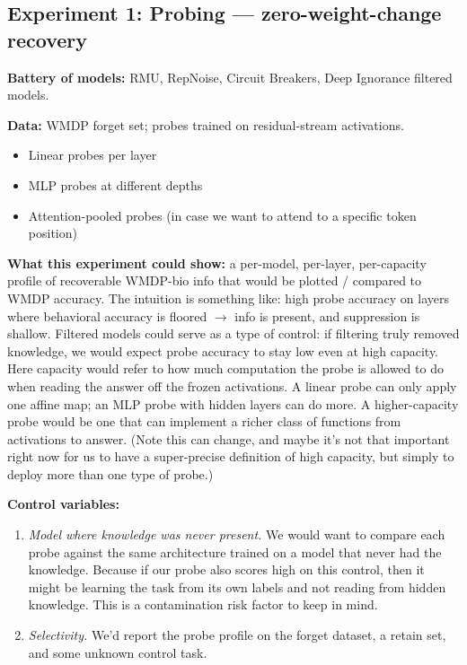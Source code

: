 \documentclass[11pt]{article}
\begin{document}
\subsection*{Experiment 1: Probing --- zero-weight-change recovery}

\textbf{Battery of models:} RMU, RepNoise, Circuit Breakers, Deep Ignorance
filtered models.

\textbf{Data:} WMDP forget set; probes trained on residual-stream activations.
\begin{itemize}
  \item Linear probes per layer
  \item MLP probes at different depths
  \item Attention-pooled probes (in case we want to attend to a specific token position)
\end{itemize}

\textbf{What this experiment could show:} a per-model, per-layer, per-capacity
profile of recoverable WMDP-bio info that would be plotted / compared to WMDP
accuracy. The intuition is something like: high probe accuracy on layers where
behavioral accuracy is floored $\rightarrow$ info is present, and suppression is
shallow. Filtered models could serve as a type of control: if filtering truly
removed knowledge, we would expect probe accuracy to stay low even at high
capacity. Here capacity would refer to how much computation the probe is allowed
to do when reading the answer off the frozen activations. A linear probe can
only apply one affine map; an MLP probe with hidden layers can do more. A
higher-capacity probe would be one that can implement a richer class of
functions from activations to answer. (Note this can change, and maybe it's not
that important right now for us to have a super-precise definition of high
capacity, but simply to deploy more than one type of probe.)

\textbf{Control variables:}
\begin{enumerate}
  \item \emph{Model where knowledge was never present.} We would want to compare
  each probe against the same architecture trained on a model that never had the
  knowledge. Because if our probe also scores high on this control, then it might
  be learning the task from its own labels and not reading from hidden knowledge.
  This is a contamination risk factor to keep in mind.
  \item \emph{Selectivity.} We'd report the probe profile on the forget dataset,
  a retain set, and some unknown control task.
\end{enumerate}
\end{document}
